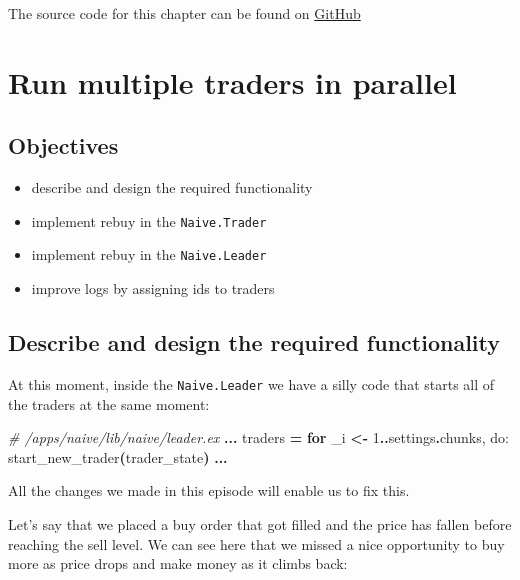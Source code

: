 \documentclass[
  oneside]{book}
\newenvironment{Shaded}{\begin{snugshade}}{\end{snugshade}}
\newcommand{\CommentTok}[1]{\textcolor[rgb]{0.56,0.35,0.01}{\textit{#1}}}
\newcommand{\DecValTok}[1]{\textcolor[rgb]{0.00,0.00,0.81}{#1}}
\newcommand{\FunctionTok}[1]{\textcolor[rgb]{0.13,0.29,0.53}{\textbf{#1}}}
\newcommand{\KeywordTok}[1]{\textcolor[rgb]{0.13,0.29,0.53}{\textbf{#1}}}
\newcommand{\NormalTok}[1]{#1}
\newcommand{\OperatorTok}[1]{\textcolor[rgb]{0.81,0.36,0.00}{\textbf{#1}}}
\newcommand{\VariableTok}[1]{\textcolor[rgb]{0.00,0.00,0.00}{#1}}
\providecommand{\tightlist}{%
  \setlength{\itemsep}{0pt}\setlength{\parskip}{0pt}}
\begin{document}
The source code for this chapter can be found on \href{https://github.com/Cinderella-Man/hands-on-elixir-and-otp-cryptocurrency-trading-bot-source-code/tree/chapter_08}{GitHub}

\chapter{Run multiple traders in parallel}\label{run-multiple-traders-in-parallel}

\section{Objectives}\label{objectives-8}

\begin{itemize}
\tightlist
\item
  describe and design the required functionality
\item
  implement rebuy in the \texttt{Naive.Trader}
\item
  implement rebuy in the \texttt{Naive.Leader}
\item
  improve logs by assigning ids to traders
\end{itemize}

\section{Describe and design the required functionality}\label{describe-and-design-the-required-functionality}

At this moment, inside the \texttt{Naive.Leader} we have a silly code that starts all of the traders at the same moment:

\begin{Shaded}
\begin{Highlighting}[]
    \CommentTok{\# /apps/naive/lib/naive/leader.ex}
    \OperatorTok{...}
\NormalTok{    traders }\OperatorTok{=}
      \KeywordTok{for}\NormalTok{ \_i }\OperatorTok{\textless{}{-}} \DecValTok{1}\OperatorTok{..}\NormalTok{settings}\OperatorTok{.}\NormalTok{chunks,}
          \VariableTok{do:}\NormalTok{ start\_new\_trader}\FunctionTok{(}\NormalTok{trader\_state}\FunctionTok{)}
    \OperatorTok{...}
\end{Highlighting}
\end{Shaded}

All the changes we made in this episode will enable us to fix this.

\newpage

Let's say that we placed a buy order that got filled and the price has fallen before reaching the sell level. We can see here that we missed a nice opportunity to buy more as price drops and make money as it climbs back:
\end{document}
